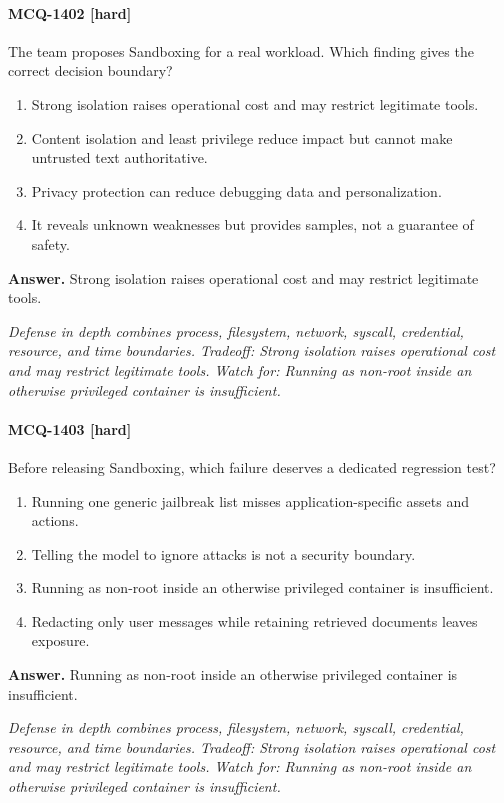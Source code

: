 \paragraph{MCQ-1402 [hard]} The team proposes Sandboxing for a real workload. Which finding gives the correct decision boundary?
\begin{enumerate}[label=\Alph*.]
\item Strong isolation raises operational cost and may restrict legitimate tools.
\item Content isolation and least privilege reduce impact but cannot make untrusted text authoritative.
\item Privacy protection can reduce debugging data and personalization.
\item It reveals unknown weaknesses but provides samples, not a guarantee of safety.
\end{enumerate}
\noindent\textbf{Answer.} Strong isolation raises operational cost and may restrict legitimate tools.
\par\textit{Defense in depth combines process, filesystem, network, syscall, credential, resource, and time boundaries. Tradeoff: Strong isolation raises operational cost and may restrict legitimate tools. Watch for: Running as non-root inside an otherwise privileged container is insufficient.}
\paragraph{MCQ-1403 [hard]} Before releasing Sandboxing, which failure deserves a dedicated regression test?
\begin{enumerate}[label=\Alph*.]
\item Running one generic jailbreak list misses application-specific assets and actions.
\item Telling the model to ignore attacks is not a security boundary.
\item Running as non-root inside an otherwise privileged container is insufficient.
\item Redacting only user messages while retaining retrieved documents leaves exposure.
\end{enumerate}
\noindent\textbf{Answer.} Running as non-root inside an otherwise privileged container is insufficient.
\par\textit{Defense in depth combines process, filesystem, network, syscall, credential, resource, and time boundaries. Tradeoff: Strong isolation raises operational cost and may restrict legitimate tools. Watch for: Running as non-root inside an otherwise privileged container is insufficient.}
